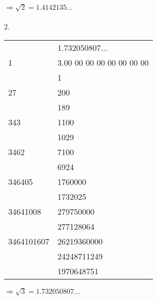$\Rightarrow \sqrt{2} = 1.4142135...$\\\\
2.\\
\begin{center}
\begin{tabular}{l|l } 
 
       & 1.732050807...\\\cline{2-2}
1      &3.00 00 00 00 00 00 00 00 \\
       & 1 \\\cline{2-2} 
27     & 200\\ 
       &{\hspace{2mm}189}\\\cline{2-2} 
343     &{\hspace{4mm}1100}\\
       &{\hspace{4mm}1029}\\\cline{2-2}
3462   &{\hspace{8mm}7100}\\
       &{\hspace{8mm}6924}\\\cline{2-2} 
346405  &{\hspace{8mm}1760000}\\ 
       &{\hspace{8mm}1732025}\\\cline{2-2} 
34641008 &{\hspace{12mm}279750000}\\ 
       &{\hspace{12mm}277128064}\\\cline{2-2}
3464101607&{\hspace{16mm}26219360000}\\ 
       &{\hspace{16mm}24248711249}\\\cline{2-2}
       &{\hspace{18mm}1970648751}\\
                                   
\end{tabular}
\end{center}
$\Rightarrow \sqrt{3} = 1.732050807...$
